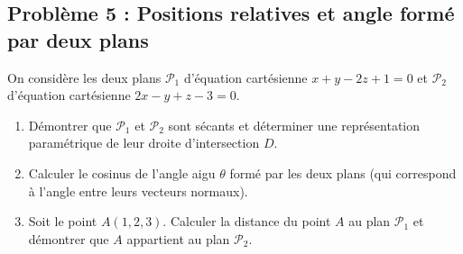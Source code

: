 \subsection*{Problème 5 : Positions relatives et angle formé par deux plans}
On considère les deux plans $\mathcal{P}_1$ d'équation cartésienne $x + y - 2z + 1 = 0$ et $\mathcal{P}_2$ d'équation cartésienne $2x - y + z - 3 = 0$.
\begin{enumerate}
    \item Démontrer que $\mathcal{P}_1$ et $\mathcal{P}_2$ sont sécants et déterminer une représentation paramétrique de leur droite d'intersection $D$.
    \item Calculer le cosinus de l'angle aigu $\theta$ formé par les deux plans (qui correspond à l'angle entre leurs vecteurs normaux).
    \item Soit le point $A(1, 2, 3)$. Calculer la distance du point $A$ au plan $\mathcal{P}_1$ et démontrer que $A$ appartient au plan $\mathcal{P}_2$.
\end{enumerate}

